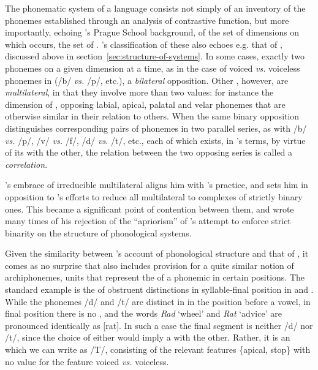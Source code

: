 The phonematic system of a language consists not simply of an
inventory of the phonemes established through an analysis of
contrastive function, but more importantly, echoing {\Martinet}'s Prague
School background, of the set of dimensions on which  occurs,
the set of . {\Martinet}'s classification of these also echoes
e.g. that of \citet{trubetzkoy39:grundzuge}, discussed above in
section~\ref{sec:structure-of-systems}. In some cases, exactly two
phonemes  on a given dimension at a time, as in the case of
voiced \emph{vs.}  voiceless phonemes in  (/b/ \emph{vs.}  /p/,
etc.), a \emph{bilateral} opposition.  Other , however, are
\emph{multilateral}, in that they involve more than two values: for
instance the dimension of , opposing labial,
apical, palatal and velar phonemes that are otherwise similar in their
relation to others. When the same binary opposition distinguishes
corresponding pairs of phonemes in two parallel series, as with /b/
\emph{vs.} /p/, /v/ \emph{vs.} /f/, /d/ \emph{vs.}  /t/, etc., each of
which exists, in {\Martinet}'s terms, by virtue of its  with the
other, the relation between the two opposing series is called a
\emph{correlation}.

{\Martinet}'s embrace of irreducible multilateral  aligns him
with {\Trubetzkoy}'s practice, and sets him in opposition to {\Jakobson}'s
efforts to reduce all multilateral  to complexes of
strictly binary ones. This became a significant point of contention
between them, and {\Martinet} wrote many times of his rejection of the
``apriorism'' of {\Jakobson}'s attempt to enforce strict binarity on the
structure of phonological systems.

Given the similarity between {\Martinet}'s account of phonological
structure and that of {\Trubetzkoy}, it comes as no surprise that
{\Martinet} also includes provision for a quite similar notion of
archiphonemes, units that represent the  of a phonemic
 in certain positions. The standard example is the
 of obstruent  distinctions in syllable-final
position in  and . While the phonemes /d/ and /t/ are
distinct in  in the position before a vowel, in final position
there is no , and the words \emph{Rad} `wheel' and \emph{Rat}
`advice' are pronounced identically as {[rat]}. In such a case the
final segment is neither /d/ nor /t/, since the choice of either would
imply a  with the other.  Rather, it is an  which
we can write as /T/, consisting of the relevant features \{apical,
stop\} with no value for the feature voiced \emph{vs.} voiceless.

